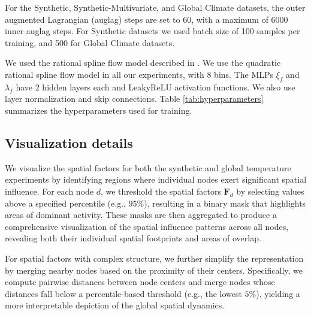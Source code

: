 For the Synthetic, Synthetic-Multivariate, and Global Climate datasets, the outer augmented Lagrangian (auglag) steps are set to 60, with a maximum of 6000 inner auglag steps. For Synthetic datasets we used batch size of 100 samples per training, and 500 for Global Climate datasets.  

We used the rational spline flow model described in \cite{durkan2019neural}. We use the quadratic rational spline flow model in all our experiments, with 8 bins. The MLPs $\xi_f$ and $\lambda_f$ have 2 hidden layers each and LeakyReLU activation functions. We also use layer normalization and skip connections. Table \ref{tab:hyperparameters} summarizes the hyperparameters used for training.
\subsection{Visualization details}

\label{section:F_visualization}

We visualize the spatial factors for both the synthetic and global temperature experiments by identifying regions where individual nodes exert significant spatial influence. For each node $d$, we threshold the spatial factors $\mathbf{F}_d$ by selecting values above a specified percentile (e.g., $95\%$), resulting in a binary mask that highlights areas of dominant activity. These masks are then aggregated to produce a comprehensive visualization of the spatial influence patterns across all nodes, revealing both their individual spatial footprints and areas of overlap.

For spatial factors with complex structure, we further simplify the representation by merging nearby nodes based on the proximity of their centers. Specifically, we compute pairwise distances between node centers and merge nodes whose distances fall below a percentile-based threshold (e.g., the lowest $5\%$), yielding a more interpretable depiction of the global spatial dynamics.



